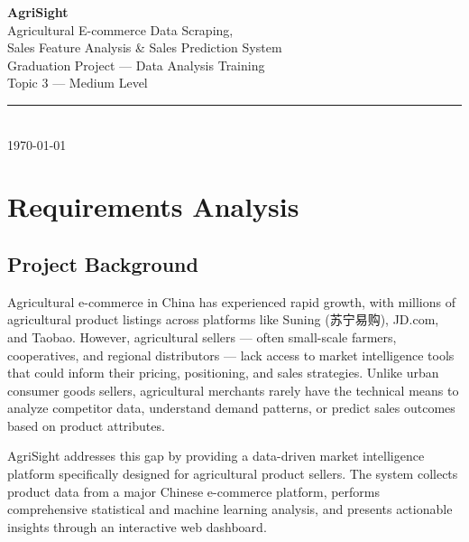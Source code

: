 \documentclass[12pt,a4paper]{report}
\begin{document}
\begin{titlepage}
  \centering
  \vspace*{3cm}
  {\Huge \textbf{AgriSight}}\\[0.4cm]
  {\Large Agricultural E-commerce Data Scraping,}\\[0.1cm]
  {\Large Sales Feature Analysis \& Sales Prediction System}\\[1.5cm]
  {\large Graduation Project — Data Analysis Training}\\[0.3cm]
  {\large Topic 3 — Medium Level}\\[2cm]
  \rule{\textwidth}{1pt}\\[0.5cm]
  {\large \today}
  \vfill
\end{titlepage}

\tableofcontents
\newpage

\chapter{Requirements Analysis}

\section{Project Background}

Agricultural e-commerce in China has experienced rapid growth, with millions of agricultural product listings across platforms like Suning (苏宁易购), JD.com, and Taobao. However, agricultural sellers --- often small-scale farmers, cooperatives, and regional distributors --- lack access to market intelligence tools that could inform their pricing, positioning, and sales strategies. Unlike urban consumer goods sellers, agricultural merchants rarely have the technical means to analyze competitor data, understand demand patterns, or predict sales outcomes based on product attributes.

AgriSight addresses this gap by providing a data-driven market intelligence platform specifically designed for agricultural product sellers. The system collects product data from a major Chinese e-commerce platform, performs comprehensive statistical and machine learning analysis, and presents actionable insights through an interactive web dashboard.
\end{document}
